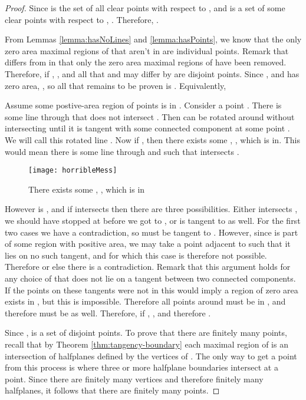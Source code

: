 \documentclass{cccg12}
\begin{document}
\begin{proof}
Since  is the set of all clear points with respect to , and  is a set of some clear points with respect to , . Therefore, . 

From Lemmas \ref{lemma:hasNoLines} and \ref{lemma:hasPoints}, we know that the only zero area maximal regions of  that aren't in  are individual points. Remark that  differs from  in that only the zero area maximal regions of  have been removed. Therefore, if , , and all that  and  may differ by are disjoint points. Since , and  has zero area, , so all that remains to be proven is . Equivalently, 

Assume some postive-area region  of points is in 
	. Consider a point . There 
	is some line  through  that does not intersect . 
	Then  can be rotated around  without intersecting  
	until it is tangent with some connected component  at some 
	point . We will call this rotated line . Now if 
	, then there exists some 
	, , which  is in. This would mean 
	there is some line  through  and  such that 
	 intersects . 

\begin{figure}[ht]
  \centering
  \texttt{[image: horribleMess]}
  \caption{There exists some , , which  is in}
  \label{fig:horribleMess}
\end{figure}

However  is , and if  intersects  then there are three possibilities. Either  intersects , we should have stopped at  before we got to , or  is tangent to  as well. For the first two cases we have a contradiction, so  must be tangent to . However, since  is part of some region with positive area, we may take a point  adjacent to  such that it lies on no such tangent, and for which this case is therefore not possible. Therefore  or else there is a contradiction. Remark that this argument holds for any choice of  that does not lie on a tangent between two connected components. If the points on these tangents were not in  this would imply a region of zero area exists in , but this is impossible. Therefore all points around  must be in , and therefore  must be as well. Therefore, if , , and therefore .

Since ,  is a set of disjoint points. To prove that there are finitely many points, recall that by Theorem \ref{thm:tangency-boundary} each maximal region of  is an intersection of halfplanes defined by the vertices of . The only way to get a point from this process is where three or more halfplane boundaries intersect at a point. Since there are finitely many vertices and therefore finitely many halfplanes, it follows that there are finitely many points. 
\end{proof}
\end{document}
